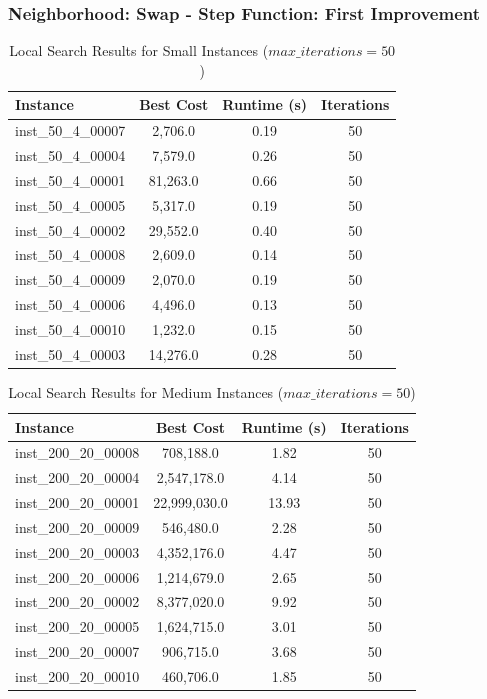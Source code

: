 \documentclass{article}
\begin{document}
\subsubsection*{Neighborhood: Swap - Step Function: First Improvement}

\begin{table}[H]
\centering
\caption{Local Search Results for Small Instances ($max\_iterations = 50$)}
\begin{tabular}{lccc}
\toprule
\textbf{Instance} & \textbf{Best Cost} & \textbf{Runtime (s)} & \textbf{Iterations} \\
\midrule
inst\_50\_4\_00007 & 2,706.0   & 0.19 & 50 \\
inst\_50\_4\_00004 & 7,579.0   & 0.26 & 50 \\
inst\_50\_4\_00001 & 81,263.0  & 0.66 & 50 \\
inst\_50\_4\_00005 & 5,317.0   & 0.19 & 50 \\
inst\_50\_4\_00002 & 29,552.0  & 0.40 & 50 \\
inst\_50\_4\_00008 & 2,609.0   & 0.14 & 50 \\
inst\_50\_4\_00009 & 2,070.0   & 0.19 & 50 \\
inst\_50\_4\_00006 & 4,496.0   & 0.13 & 50 \\
inst\_50\_4\_00010 & 1,232.0   & 0.15 & 50 \\
inst\_50\_4\_00003 & 14,276.0  & 0.28 & 50 \\
\bottomrule
\end{tabular}
\label{tab:local_search_results_50_4}
\end{table}

\begin{table}[H]
\centering
\caption{Local Search Results for Medium Instances ($max\_iterations = 50$)}
\begin{tabular}{lccc}
\toprule
\textbf{Instance} & \textbf{Best Cost} & \textbf{Runtime (s)} & \textbf{Iterations} \\
\midrule
inst\_200\_20\_00008 & 708,188.0   & 1.82 & 50 \\
inst\_200\_20\_00004 & 2,547,178.0 & 4.14 & 50 \\
inst\_200\_20\_00001 & 22,999,030.0 & 13.93 & 50 \\
inst\_200\_20\_00009 & 546,480.0   & 2.28 & 50 \\
inst\_200\_20\_00003 & 4,352,176.0 & 4.47 & 50 \\
inst\_200\_20\_00006 & 1,214,679.0 & 2.65 & 50 \\
inst\_200\_20\_00002 & 8,377,020.0 & 9.92 & 50 \\
inst\_200\_20\_00005 & 1,624,715.0 & 3.01 & 50 \\
inst\_200\_20\_00007 & 906,715.0   & 3.68 & 50 \\
inst\_200\_20\_00010 & 460,706.0   & 1.85 & 50 \\
\bottomrule
\end{tabular}
\label{tab:local_search_results_200_20}
\end{table}
\end{document}
